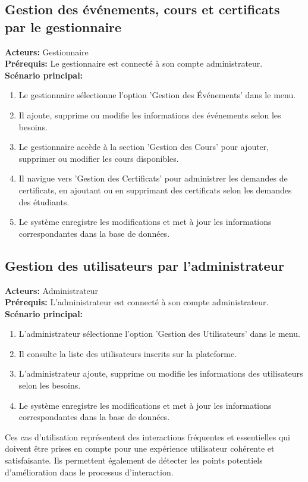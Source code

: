 \documentclass[a4paper, 11pt, openany]{report}
\begin{document}
\subsection{Gestion des événements, cours et certificats par le gestionnaire}
\textbf{Acteurs:} Gestionnaire \\
\textbf{Prérequis:} Le gestionnaire est connecté à son compte administrateur. \\
\textbf{Scénario principal:}
\begin{enumerate}
    \item Le gestionnaire sélectionne l'option 'Gestion des Événements' dans le menu.
    \item Il ajoute, supprime ou modifie les informations des événements selon les besoins.
    \item Le gestionnaire accède à la section 'Gestion des Cours' pour ajouter, supprimer ou modifier les cours disponibles.
    \item Il navigue vers 'Gestion des Certificats' pour administrer les demandes de certificats, en ajoutant ou en supprimant des certificats selon les demandes des étudiants.
    \item Le système enregistre les modifications et met à jour les informations correspondantes dans la base de données.
\end{enumerate}

\subsection{Gestion des utilisateurs par l'administrateur}
\textbf{Acteurs:} Administrateur \\
\textbf{Prérequis:} L'administrateur est connecté à son compte administrateur. \\
\textbf{Scénario principal:}
\begin{enumerate}
    \item L'administrateur sélectionne l'option 'Gestion des Utilisateurs' dans le menu.
    \item Il consulte la liste des utilisateurs inscrits sur la plateforme.
    \item L'administrateur ajoute, supprime ou modifie les informations des utilisateurs selon les besoins.
    \item Le système enregistre les modifications et met à jour les informations correspondantes dans la base de données.
\end{enumerate}

Ces cas d'utilisation représentent des interactions fréquentes et essentielles qui doivent être prises en compte pour une expérience utilisateur cohérente et satisfaisante. Ils permettent également de détecter les points potentiels d'amélioration dans le processus d'interaction.
\end{document}
